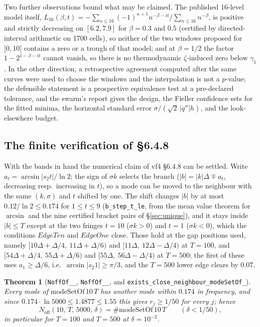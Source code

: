 \documentclass[11pt,a4paper]{article}
\newcommand{\lb}{\_\allowbreak}
\newcommand{\code}[1]{\texttt{#1}}
\newtheorem{theorem}{Theorem}[section]
\theoremstyle{definition}
\theoremstyle{remark}
\begin{document}
Two further observations bound what may be claimed. The published 16-level model itself,
$L_{16}(\beta,t) = -\sum_{n\le 16}(-1)^{n+1}n^{-\beta-it}\big/\sum_{n\le 16}n^{-\beta}$, is positive
and strictly decreasing on $[6.2,7.9]$ for $\beta = 0.3$ and $0.5$ (certified by directed-interval
arithmetic on 1700 cells), so neither of the two windows proposed for $]0,10[$ contains a zero or a
trough of that model; and at $\beta = 1/2$ the factor $1-2^{1-\beta-it}$ cannot vanish, so there is
no thermodynamic $\zeta$-induced zero below $\gamma_1$. In the other direction, a retrospective
agreement computed after the same curves were used to choose the windows and the interpolation is
not a $p$-value; the defensible statement is a prospective equivalence test at a pre-declared
tolerance, and the swarm's report gives the design, the Fieller confidence sets for the fitted
minima, the horizontal standard error $\sigma/(\sqrt2\,|q''|h)$, and the look-elsewhere budget.

\subsection{The finite verification of \S6.4.8}\label{sec:finite}

With the bands in hand the numerical claim of vf4 \S6.4.8 can be settled.  Write
$a_t = \arcsin|s_2 t|/\ln 2$; the sign of $\sigma k$ selects the branch
($|b| = |k|\Delta \mp a_t$, decreasing resp.\ increasing in $t$), so a mode can be moved to the
neighbour with the same $(k,\sigma)$ and $t$ shifted by one.  The shift changes $|b|$ by at most
$0.12/\ln 2 \le 0.174$ for $1 \le t \le 9$ (\code{b\lb step\lb t\lb le}, from the mean value theorem
for $\arcsin$ and the nine certified bracket pairs of \S\ref{sec:unique}), and it stays inside
$|b| \le T$ except at the two fringes $t = 10$ ($\sigma k > 0$) and $t = 1$ ($\sigma k < 0$), which
the conditions $EdgeTen$ and $EdgeOne$ close.  Those hold at the gap positions used, namely
$[10\Delta+\Delta/4,\ 11\Delta+\Delta/6)$ and $[11\Delta,\ 12\Delta-\Delta/4)$ at $T = 100$, and
$[54\Delta+\Delta/4,\ 55\Delta+\Delta/6)$ and $[55\Delta,\ 56\Delta-\Delta/4)$ at $T = 500$; the
first of these uses $a_1 \ge \Delta/6$, i.e.\ $\arcsin|s_2 1| \ge \pi/3$, and the $T = 500$ lower
edge clears by $0.07$.

\begin{theorem}[\code{NoffOf\lb 10\lb 100}, \code{NoffOf\lb 10\lb 500}, and
\code{exists\lb close\lb neighbour\lb modeSetOf\lb 10}]\label{thm:finite}
Every mode of $\mathrm{modeSetOf}\,10\,T$ has another mode within $0.174$ in frequency, and since
$0.174 \cdot \ln 5000 \le 1.4877 \le 1.55$ this gives $r_j \ge 1/50$ for every $j$; hence
\[
  N_{\mathrm{off}}(10,\,T,\,5000,\,\delta) = \#\mathrm{modeSetOf}\,10\,T
  \qquad(\delta < 1/50),
\]
in particular for $T = 100$ and $T = 500$ at $\delta = 10^{-2}$.
\end{theorem}
\end{document}

